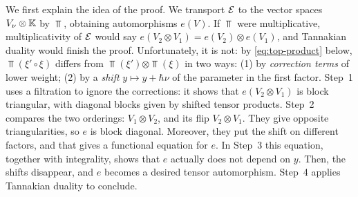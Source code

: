 \documentclass{article}
\theoremstyle{plain}
\theoremstyle{definition}
\theoremstyle{remark}
\numberwithin{equation}{section}
\begin{document}
We first explain the idea of the proof. We transport $\mathcal E$ to the vector spaces $V_\nu\otimes\mathbb K$ by $\Top$, obtaining automorphisms $e(V)$. If $\Top$ were multiplicative, multiplicativity of $\mathcal E$ would say $e(V_2\otimes V_1)=e(V_2)\otimes e(V_1)$, and Tannakian duality would finish the proof. Unfortunately, it is not: by \eqref{eq:top-product} below, $\Top(\xi'\circ\xi)$ differs from $\Top(\xi')\otimes\Top(\xi)$ in two ways: (1) by \emph{correction terms} of lower weight; (2) by a \emph{shift} $y\mapsto y+\hbar\nu$ of the parameter in the first factor. Step~1 uses a filtration to ignore the corrections: it shows that $e(V_2\otimes V_1)$ is block triangular, with diagonal blocks given by shifted tensor products. Step~2 compares the two orderings: $V_1\otimes V_2$, and its flip $V_2\otimes V_1$. They give opposite triangularities, so $e$ is block diagonal. Moreover, they put the shift on different factors, and that gives a functional equation for $e$. In Step~3 this equation, together with integrality, shows that $e$ actually does not depend on $y$. Then, the shifts disappear, and $e$ becomes a desired tensor automorphism. Step~4 applies Tannakian duality to conclude.
\end{document}
